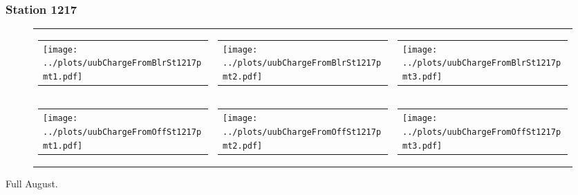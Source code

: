 \documentclass[aspectratio=169]{beamer}
\begin{document}
\begin{frame} 
  \frametitle{Station 1217}
 
  \begin{figure}
    \centering
    \begin{tabularx}{\textwidth}{LCR}
      \begin{tabular}{l}
        \texttt{[image: ../plots/uubChargeFromBlrSt1217pmt1.pdf]}
      \end{tabular}
      &
      \begin{tabular}{l}
        \texttt{[image: ../plots/uubChargeFromBlrSt1217pmt2.pdf]}
      \end{tabular}
      &
      \begin{tabular}{l}
        \texttt{[image: ../plots/uubChargeFromBlrSt1217pmt3.pdf]}
      \end{tabular}
      \\
      \begin{tabular}{l}
        \texttt{[image: ../plots/uubChargeFromOffSt1217pmt1.pdf]}
      \end{tabular}
      &
      \begin{tabular}{l}
        \texttt{[image: ../plots/uubChargeFromOffSt1217pmt2.pdf]}
      \end{tabular}
      &
      \begin{tabular}{l}
        \texttt{[image: ../plots/uubChargeFromOffSt1217pmt3.pdf]}
      \end{tabular}
    \end{tabularx}
  \end{figure}
  Full August. 
\end{frame}
\end{document}
